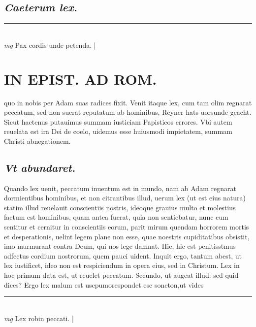 \documentclass{article}
\begin{document}
\begin{pages}
\subsection*{\textit{Caeterum lex. }}
\vspace{0.5cm}\noindent
\vspace{0.2cm}\rule{1cm}{0.2pt}\\ 
\hspace{0.2cm}\textit{mg}
\footnotesize Pax cordis unde petenda.  
\normalsize| 
\section*{IN EPIST. AD ROM.  }
\marginpar{[ p.50 ]}\pstart quo in nobis per Adam suas radices fixit. Venit itaque lex, cum tam olim regnarat peccatum, sed non suerat reputatum ab hominibus, Reyner hats uorsunde geacht. Sicut hactenus putauimus summam iusticiam Papisticos errores. Vbi autem reuelata est ira Dei de coelo, uidemus esse huiusmodi impietatem, summam Christi abnegationem.   \pend
{}
{}
\subsection*{\textit{Vt abundaret. }}\pstart Quando lex uenit, peccatum inuentum est in mundo, nam ab Adam regnarat dormientibus hominibus, et non citrantibus illud, uerum lex (ut est eius natura) statim illud reuelauit conscientiis nostris, ideoque grauius multo et molestius factum est hominibus, quam antea fuerat, quia non sentiebatur, nunc cum sentitur et cernitur in conscientiis eorum, parit mirum quendam horrorem mortis et desperationis, uelint legem plane non esse, quae noestris cupiditatibus obsistit, imo murmurant contra Deum, qui nos lege damnat. Hic, hic est penitisstmus adfectus cordium nostrorum, quem pauci uident.  Inquit ergo, tantum abest, ut lex iustificet, ideo non est respiciendum in opera eius, sed in Christum.  Lex in hoc primum data est, ut reuelet peccatum. Secundo, ut augeat illud: sed quid dices? Ergo lex malum est uscpumorespondet ese soncton,ut vides  \pend
\vspace{0.5cm}\noindent
\vspace{0.2cm}\rule{1cm}{0.2pt}\\ 
\hspace{0.2cm}\textit{mg}
\footnotesize Lex robin peccati.  
\normalsize| 

\end{pages}
\end{document}
